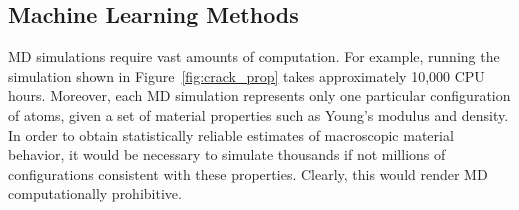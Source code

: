 
%



\subsection{Machine Learning Methods} 


MD simulations require vast amounts of computation. For example, running the simulation shown in Figure~\ref{fig:crack_prop} takes approximately 10,000 CPU hours.  %
Moreover, each MD simulation represents only one particular configuration of atoms, given a set of material properties such as Young's modulus and density. In order to obtain statistically reliable estimates of macroscopic material behavior, it would be necessary to simulate thousands if not millions of configurations consistent with these properties.  Clearly, this would render MD computationally prohibitive.

